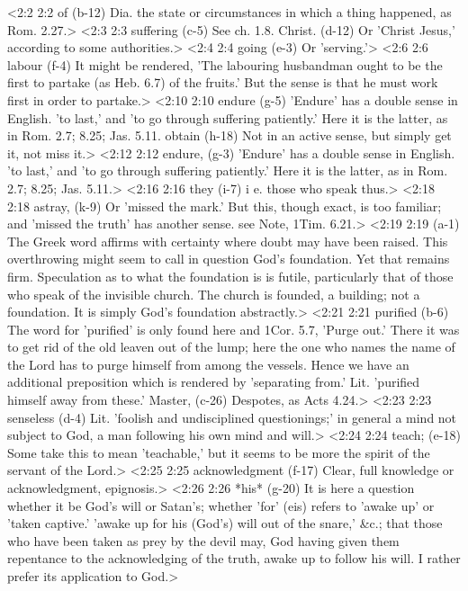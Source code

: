 <2:2 2:2  of (b-12)  Dia. the state or circumstances in which a thing happened,  as Rom. 2.27.>
<2:3 2:3  suffering (c-5)  See ch. 1.8.
  Christ. (d-12)  Or 'Christ Jesus,' according to some authorities.>
<2:4 2:4  going (e-3)  Or 'serving.'>
<2:6 2:6  labour (f-4)  It might be rendered, 'The labouring husbandman ought to be  the first to partake (as Heb. 6.7) of the fruits.' But the  sense is that he must work first in order to partake.>
<2:10 2:10  endure (g-5)  'Endure' has a double sense in English. 'to last,' and 'to go  through suffering patiently.' Here it is the latter, as in Rom.  2.7; 8.25; Jas. 5.11.
  obtain (h-18)  Not in an active sense, but simply get it, not miss it.>
<2:12 2:12  endure, (g-3)  'Endure' has a double sense in English. 'to last,' and 'to go  through suffering patiently.' Here it is the latter, as in Rom.  2.7; 8.25; Jas. 5.11.>
<2:16 2:16  they (i-7)  i e. those who speak thus.>
<2:18 2:18  astray, (k-9)  Or 'missed the mark.' But this, though exact, is too  familiar; and 'missed the truth' has another sense. see Note, 1Tim. 6.21.>
<2:19 2:19   (a-1)  The Greek word affirms with certainty where doubt may have  been raised. This overthrowing might seem to call in question  God's foundation. Yet that remains firm. Speculation as to what  the foundation is is futile, particularly that of those who  speak of the invisible church. The church is founded, a  building; not a foundation. It is simply God's foundation  abstractly.>
<2:21 2:21  purified (b-6)  The word for 'purified' is only found here and 1Cor. 5.7,  'Purge out.' There it was to get rid of the old leaven out of  the lump; here the one who names the name of the Lord has to  purge himself from among the vessels. Hence we have an  additional preposition which is rendered by 'separating from.'  Lit. 'purified himself away from these.'
  Master, (c-26)  Despotes, as Acts 4.24.>
<2:23 2:23  senseless (d-4)  Lit. 'foolish and undisciplined questionings;' in general a  mind not subject to God, a man following his own mind and will.>
<2:24 2:24  teach; (e-18)  Some take this to mean 'teachable,' but it seems to be more  the spirit of the servant of the Lord.>
<2:25 2:25  acknowledgment (f-17)  Clear, full knowledge or acknowledgment, epignosis.>
<2:26 2:26  *his* (g-20)  It is here a question whether it be God's will or Satan's;  whether 'for' (eis) refers to 'awake up' or 'taken captive.'  'awake up for his (God's) will out of the snare,' &c.; that  those who have been taken as prey by the devil may, God having  given them repentance to the acknowledging of the truth, awake  up to follow his will. I rather prefer its application to God.>
